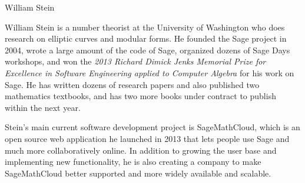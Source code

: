 \begin{participant}[type=R,PM=0,salary=9000]{William Stein}

William Stein is a number theorist at the University of Washington
who does research on elliptic curves and modular forms.
He founded the Sage project in 2004, wrote a large
amount of the code of Sage, organized dozens of Sage Days workshops,
and won the {\em 2013 Richard Dimick Jenks
Memorial Prize for Excellence in
Software Engineering applied to Computer Algebra} for his work on Sage.
He has written dozens of research papers and
also published two mathematics textbooks, and has two more books
under contract to publish within the next year.

Stein's main current software development project is SageMathCloud,
which is an open source web application he launched in 2013
that lets people use Sage and much more collaboratively online.
In addition to growing the user base and implementing
new functionality, he is also creating a company to make
SageMathCloud better supported and
more widely available and scalable.

\end{participant}

